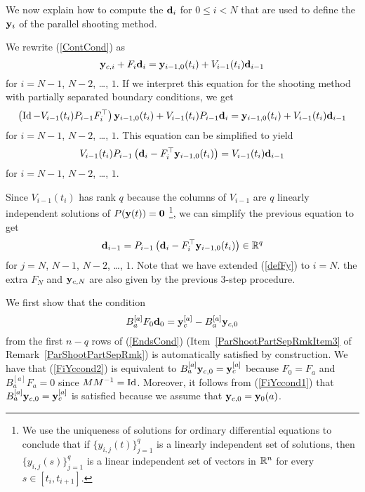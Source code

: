 We now explain how to compute the $\mathbf{d}_i$ for $0\leq i < N$
that are used to define the $\mathbf{y}_i$ of the parallel shooting method.

We rewrite (\ref{ContCond}) as 
\[
  \mathbf{y}_{c,i} + F_i\mathbf{d}_i = \mathbf{y}_{i-1,0}(t_i) + V_{i-1}(t_i)
\mathbf{d}_{i-1}
\]
for $i=N-1$, $N-2$, \ldots, $1$.  If we interpret this equation for
the shooting method with partially separated boundary conditions, we get
\[
\left(\operatorname{Id} - V_{i-1}(t_i)P_{i-1}F_i^\top \right)\mathbf{y}_{i-1,0}(t_i) +
V_{i-1}(t_i)P_{i-1}\mathbf{d}_i = \mathbf{y}_{i-1,0}(t_i) + V_{i-1}(t_i)\mathbf{d}_{i-1}
\]
for $i=N-1$, $N-2$, \ldots, $1$.  This equation can be simplified to
yield
\[
V_{i-1}(t_i)P_{i-1} \left( \mathbf{d}_i - F_i^\top\mathbf{y}_{i-1,0}(t_i)
\right) = V_{i-1}(t_i)\mathbf{d}_{i-1}
\]
for $i=N-1$, $N-2$, \ldots, $1$.

Since $V_{i-1}(t_i)$ has rank $q$ because the columns of $V_{i-1}$
are $q$ linearly independent solutions of $P(\mathbf{y}(t)) = \mathbf{0}$
\footnote{We use the uniqueness of solutions for ordinary differential
equations to conclude that if $\displaystyle \{y_{i,j}(t)\}_{j=1}^q$
is a linearly independent set of solutions, then
$\displaystyle \{y_{i,j}(s)\}_{j=1}^q$ is a linear independent set of
vectors in $\mathbb{R}^n$ for every $s\in [t_i,t_{i+1}]$.},
we can simplify the previous equation to get
\begin{equation} \label{defFy}
\mathbf{d}_{i-1} = P_{i-1} \left( \mathbf{d}_i - F_i^\top\mathbf{y}_{i-1,0}(t_i)
\right) \in \mathbb{R}^q
\end{equation}
for $j=N$, $N-1$, $N-2$, \ldots, $1$.  Note that we have extended
(\ref{defFy}) to $i = N$. the extra $F_N$ and $\mathbf{y}_{c,N}$
are also given by the previous $3$-step procedure.

We first show that the condition
\begin{equation}\label{FiYccond2}
  B_a^{[a]} F_0 \mathbf{d}_0 = \mathbf{y}_c^{[a]} - B_a^{[a]} \mathbf{y}_{c,0} 
\end{equation}
from the first $n-q$ rows of (\ref{EndsCond})
(Item~\ref{ParShootPartSepRmkItem3} of
Remark~\ref{ParShootPartSepRmk}) is automatically 
satisfied by construction.  We have that (\ref{FiYccond2}) is equivalent
to $B_a^{[a]} \mathbf{y}_{c,0} = \mathbf{y}_c^{[a]}$ because $F_0 = F_a$ and
$B_a^{[a]} F_a = 0$ since $M M^{-1} = \operatorname{Id}$.  Moreover, it follows from
(\ref{FiYccond1}) that $B_a^{[a]} \mathbf{y}_{c,0} = \mathbf{y}_c^{[a]}$ is
satisfied because we assume that $\mathbf{y}_{c,0} = \mathbf{y}_0(a)$.

